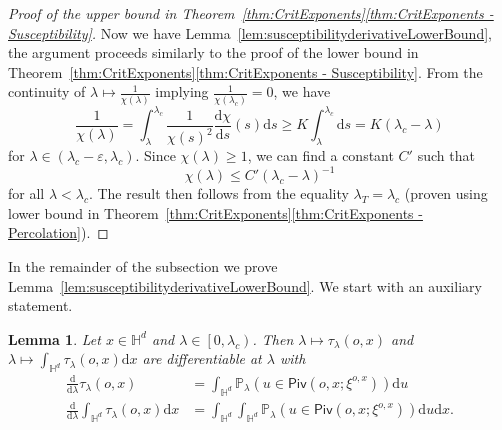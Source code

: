 \documentclass[10pt,a4paper,dvipsnames]{article}
\newtheorem{lemma}[theorem]{Lemma}
\theoremstyle{definition}
\theoremstyle{remark}
\newcommand{\pla}{\mathbb P_\lambda}
\newcommand{\HypDim}{{\mathbb{H}^d}}
\newcommand{\dd}{\mathrm{d}} %
\newcommand{\piv}[1]{\mathsf {Piv}(#1)}
\newcommand{\tlam}{\tau_\lambda}
\newcommand{\orig}{o}
\numberwithin{equation}{section}
\begin{document}
\begin{proof}[Proof of the upper bound in Theorem~\ref{thm:CritExponents}\ref{thm:CritExponents - Susceptibility}]
Now we have Lemma~\ref{lem:susceptibilityderivativeLowerBound}, the argument proceeds similarly to the proof of the lower bound in Theorem~\ref{thm:CritExponents}\ref{thm:CritExponents - Susceptibility}. From the continuity of $\lambda\mapsto\frac{1}{\chi\left(\lambda\right)}$ implying $\frac{1}{\chi\left(\lambda_c\right)}=0$, we have
\begin{equation}
    \frac{1}{\chi\left(\lambda\right)} = \int^{\lambda_c}_{\lambda}\frac{1}{\chi\left(s\right)^2}\frac{\dd \chi}{\dd s}\left(s\right)\dd s \geq K\int^{\lambda_c}_\lambda\dd s = K\left(\lambda_c-\lambda\right)
\end{equation}
for $\lambda\in\left(\lambda_c-\varepsilon,\lambda_c\right)$. Since $\chi\left(\lambda\right)\geq 1$, we can find a constant $C'$ such that 
\begin{equation}
    \chi\left(\lambda\right) \leq C'\left(\lambda_c-\lambda\right)^{-1}
\end{equation}
for all $\lambda<\lambda_c$. The result then follows from the equality $\lambda_T=\lambda_c$ (proven using lower bound in Theorem~\ref{thm:CritExponents}\ref{thm:CritExponents - Percolation}).
\end{proof}


In the remainder of the subsection we prove Lemma~\ref{lem:susceptibilityderivativeLowerBound}. We start with an auxiliary statement.

\begin{lemma}
\label{lem:Two-point-derivatives}
    Let $x\in\HypDim$ and $\lambda\in\left[0,\lambda_c\right)$. Then $\lambda\mapsto \tlam\left(\orig,x\right)$ and $\lambda\mapsto \int_{\HypDim}\tlam\left(\orig,x\right)\dd x$ are differentiable at $\lambda$ with
    \begin{align}
        \frac{\dd}{\dd \lambda}\tlam\left(\orig,x\right) &= \int_\HypDim\pla\left(u\in\piv{\orig,x;\xi^{\orig,x}}\right)\dd u \label{eqn:pointwiseDerivative}\\
        \frac{\dd}{\dd \lambda}\int_{\HypDim}\tlam\left(\orig,x\right)\dd x &= \int_\HypDim\int_\HypDim\pla\left(u\in\piv{\orig,x;\xi^{\orig,x}}\right)\dd u\dd x.\label{eqn:integralDerivative}
    \end{align}
\end{lemma}
\end{document}
